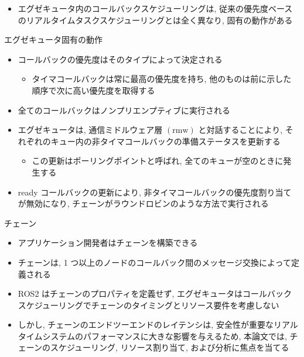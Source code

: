 \begin{frame}{}
    \begin{itemize}
        \item エグゼキュータ内のコールバックスケジューリングは, 従来の優先度ベースのリアルタイムタスクスケジューリングとは全く異なり, 固有の動作がある
    \end{itemize}
\end{frame}

\begin{frame}{ エグゼキュータ固有の動作}
    \begin{itemize}
        \item コールバックの優先度はそのタイプによって決定される
              \begin{itemize}
                  \item タイマコールバックは常に最高の優先度を持ち, 他のものは前に示した順序で次に高い優先度を取得する
              \end{itemize}
        \item 全てのコールバックはノンプリエンプティブに実行される
        \item エグゼキュータは, 通信ミドルウェア層 $(\mathrm{rmw})$ と対話することにより, それぞれのキュー内の非タイマコールバックの準備ステータスを更新する
              \begin{itemize}
                  \item この更新はポーリングポイントと呼ばれ, 全てのキューが空のときに発生する
              \end{itemize}
        \item ready コールバックの更新により, 非タイマコールバックの優先度割り当てが無効になり, チェーンがラウンドロビンのような方法で実行される
    \end{itemize}
\end{frame}

\begin{frame}{チェーン}
    \begin{itemize}
        \item アプリケーション開発者はチェーンを構築できる
        \item チェーンは, 1 つ以上のノードのコールバック間のメッセージ交換によって定義される
        \item ROS2 はチェーンのプロパティを定義せず, エグゼキュータはコールバックスケジューリングでチェーンのタイミングとリソース要件を考慮しない
        \item しかし, チェーンのエンドツーエンドのレイテンシは, 安全性が重要なリアルタイムシステムのパフォーマンスに大きな影響を与えるため, 本論文では, チェーンのスケジューリング, リソース割り当て, および分析に焦点を当てる
    \end{itemize}
\end{frame}

